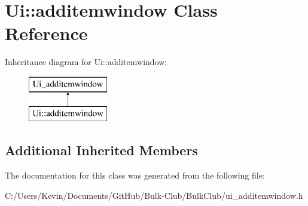 \hypertarget{class_ui_1_1additemwindow}{}\section{Ui\+:\+:additemwindow Class Reference}
\label{class_ui_1_1additemwindow}
Inheritance diagram for Ui\+:\+:additemwindow\+:\begin{figure}[H]
\begin{center}
\leavevmode
\includegraphics[height=2.000000cm]{class_ui_1_1additemwindow}
\end{center}
\end{figure}
\subsection*{Additional Inherited Members}


The documentation for this class was generated from the following file\+:\begin{DoxyCompactItemize}
\item 
C\+:/\+Users/\+Kevin/\+Documents/\+Git\+Hub/\+Bulk-\/\+Club/\+Bulk\+Club/ui\+\_\+additemwindow.\+h\end{DoxyCompactItemize}
